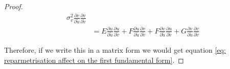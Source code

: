 \documentclass{article}
\theoremstyle{plain}
\theoremstyle{definition}
\theoremstyle{remark}
\begin{document}
\begin{proof}[Proof]
\begin{align*}
        \sigma_v^2 \frac{\partial v}{ \partial \tilde{u}} \frac{\partial v}{ \partial \tilde{v}}                                                                                                                                   \\
                  & = E \frac{\partial u}{ \partial \tilde{u}} \frac{\partial u}{ \partial \tilde{v}} +
        F \frac{\partial u}{ \partial \tilde{u}} \frac{\partial v}{ \partial \tilde{v}} +
        F \frac{\partial v}{ \partial \tilde{u}} \frac{\partial u}{ \partial \tilde{v}} +
        G \frac{\partial v}{ \partial \tilde{u}} \frac{\partial v}{ \partial \tilde{v}}
    \end{align*}

    Therefore, if we write this in a matrix form we would get equation \ref{eq: reparmetrisation affect on the first fundamental form}.

\end{proof}
\end{document}
